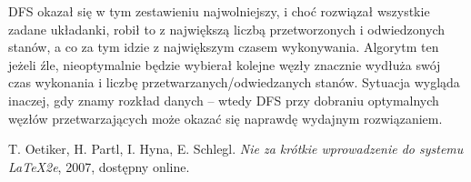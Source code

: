 \documentclass{classrep}
\begin{document}
DFS okazał się w tym zestawieniu najwolniejszy, i choć rozwiązał wszystkie zadane układanki, robił to z największą liczbą przetworzonych i odwiedzonych stanów, a co za tym idzie z największym czasem wykonywania. Algorytm ten jeżeli źle, nieoptymalnie będzie wybierał kolejne węzły znacznie wydłuża swój czas wykonania i liczbę przetwarzanych/odwiedzanych stanów. Sytuacja wygląda inaczej, gdy znamy rozkład danych – wtedy DFS przy dobraniu optymalnych węzłów przetwarzających może okazać się naprawdę wydajnym rozwiązaniem.
\begin{thebibliography}{0}
   T. Oetiker, H. Partl, I. Hyna, E. Schlegl.
    \textsl{Nie za krótkie wprowadzenie do systemu \LaTeX2e}, 2007, dostępny online.
\end{thebibliography}
\end{document}
